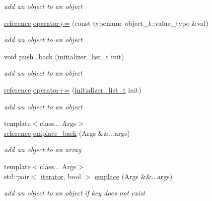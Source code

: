 \begin{DoxyCompactItemize}
\begin{DoxyCompactList}\small\item\em add an object to an object \end{DoxyCompactList}\item 
\hyperlink{classnlohmann_1_1basic__json_ac6a5eddd156c776ac75ff54cfe54a5bc}{reference} \hyperlink{classnlohmann_1_1basic__json_abf04978d85a2d5c4754f4806d42f46fd}{operator+=} (const typename object\+\_\+t\+::value\+\_\+type \&val)
\begin{DoxyCompactList}\small\item\em add an object to an object \end{DoxyCompactList}\item 
void \hyperlink{classnlohmann_1_1basic__json_a1be31ef2d2934d37a818083a4af44f99}{push\+\_\+back} (\hyperlink{classnlohmann_1_1basic__json_a670f6a0eb3d1e0ffd00c27d35472ccc9}{initializer\+\_\+list\+\_\+t} init)
\begin{DoxyCompactList}\small\item\em add an object to an object \end{DoxyCompactList}\item 
\hyperlink{classnlohmann_1_1basic__json_ac6a5eddd156c776ac75ff54cfe54a5bc}{reference} \hyperlink{classnlohmann_1_1basic__json_af245c2b6714d76ed99a2d02f2596d596}{operator+=} (\hyperlink{classnlohmann_1_1basic__json_a670f6a0eb3d1e0ffd00c27d35472ccc9}{initializer\+\_\+list\+\_\+t} init)
\begin{DoxyCompactList}\small\item\em add an object to an object \end{DoxyCompactList}\item 
{\footnotesize template$<$class... Args$>$ }\\\hyperlink{classnlohmann_1_1basic__json_ac6a5eddd156c776ac75ff54cfe54a5bc}{reference} \hyperlink{classnlohmann_1_1basic__json_ac783b1cf4b720364840275412912c01d}{emplace\+\_\+back} (Args \&\&...args)
\begin{DoxyCompactList}\small\item\em add an object to an array \end{DoxyCompactList}\item 
{\footnotesize template$<$class... Args$>$ }\\std\+::pair$<$ \hyperlink{classnlohmann_1_1basic__json_a099316232c76c034030a38faa6e34dca}{iterator}, bool $>$ \hyperlink{classnlohmann_1_1basic__json_ab515108f8219ac33256a48066bbc7354}{emplace} (Args \&\&...args)
\begin{DoxyCompactList}\small\item\em add an object to an object if key does not exist \end{DoxyCompactList}\item 

\end{DoxyCompactItemize}
